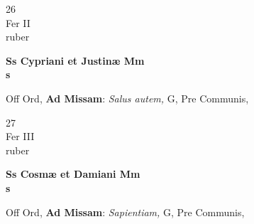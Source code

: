 \documentclass[10pt, openany]{book}
\begin{document}
        \begin{center}
            \begin{minipage}{3.5in}
                \vspace{2em}
                \begin{minipage}{0.5in}
                    {\Huge 26} \\
                    {\normalsize Fer II} \\
                    {\normalsize ruber}
                \end{minipage}
                \begin{minipage}{3.0in}
                    \textbf{ \large Ss Cypriani et Justinæ Mm \\
                    \textnormal{\normalsize s}} \\ 
                \end{minipage}
                \begin{justify}Off Ord, \textbf{Ad Missam}: \textit{Salus autem,} G, Pre Communis,   
                \end{justify}
            \end{minipage}
        \end{center}
    
        \begin{center}
            \begin{minipage}{3.5in}
                \vspace{2em}
                \begin{minipage}{0.5in}
                    {\Huge 27} \\
                    {\normalsize Fer III} \\
                    {\normalsize ruber}
                \end{minipage}
                \begin{minipage}{3.0in}
                    \textbf{ \large Ss Cosmæ et Damiani Mm \\
                    \textnormal{\normalsize s}} \\ 
                \end{minipage}
                \begin{justify}Off Ord, \textbf{Ad Missam}: \textit{Sapientiam,} G, Pre Communis,   
                \end{justify}
            \end{minipage}
        \end{center}
    
\end{document}
